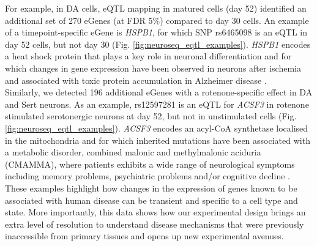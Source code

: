 For example, in DA cells, eQTL mapping in matured cells (day 52) identified an additional set of 270 eGenes (at FDR 5\%) compared to day 30 cells.
An example of a timepoint-specific eGene is \textit{HSPB1}, for which SNP rs6465098 is an eQTL in day 52 cells, but not day 30 (Fig. \ref{fig:neuroseq_eqtl_examples}). 
\textit{HSPB1} encodes a heat shock protein that plays a key role in neuronal differentiation \cite{miller2018heat} and for which changes in gene expression have been observed in neurons after ischemia \cite{bartelt2016hspb5} and associated with toxic protein accumulation in Alzheimer disease \cite{shimura2004binding, wilhelmus2006small}.\\

Similarly, we detected 196 additional eGenes with a rotenone-specific effect in DA and Sert neurons. 
As an example, rs12597281 is an eQTL for \textit{ACSF3} in rotenone stimulated serotonergic neurons at day 52, but not in unstimulated cells (Fig. \ref{fig:neuroseq_eqtl_examples}). 
\textit{ACSF3} encodes an acyl-CoA synthetase localised in the mitochondria and for which inherited mutations have been associated with a metabolic disorder, combined malonic and methylmalonic aciduria (CMAMMA), where patients exhibits a wide range of neurological symptoms including memory problems, psychiatric problems and/or cognitive decline \cite{tucci2020brain}.\\

These examples highlight how changes in the expression of genes known to be associated with human disease can be transient and specific to a cell type and state. 
More importantly, this data shows how our experimental design brings an extra level of resolution to understand disease mechanisms that were previously inaccessible from primary tissues and opens up new experimental avenues. \\



